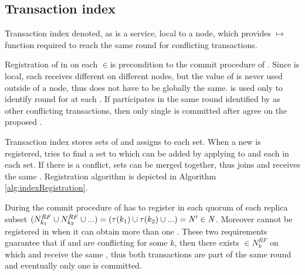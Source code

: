 
\subsection{Transaction index}
\label{sec:mpp:txIndex}
Transaction index denoted, as \txIndex is a service, local to a node, which provides \mbox{\txState $\mapsto $ \paxosRoundId} function required to reach the same \paxos round for conflicting transactions.

Registration of \txState in \txIndex on each  $\in$\nodesTx is precondition to the commit procedure of \mpt. 
Since \txIndex is local, each \transaction receives different \paxosRoundId on different nodes, but the value of \paxosRoundId is never used outside of a node, thus \paxosRoundId does not have to be globally the same. \paxosRoundId is used only to identify \paxos round for \conflictingTxSet at each . If \transaction participates in the same \paxos round identified by \paxosRoundId as other conflicting transactions, then only single \transaction is committed after \nodesTx agree on the proposed \txState.

Transaction index stores sets of \conflictingTxSet and assigns \paxosRoundId to each set. When a new \txStateM is registered, \txIndex tries to find a set \conflictingTxSet to which \txStateM can be added by applying \conflictFunction to \txStateM and each \transaction in each set. If there is a conflict, sets can be merged together, thus \txStateM joins \conflictingTxSet and receives the same \paxosRoundId. Registration algorithm is depicted in Algorithm \ref{alg:indexRegistration}.

During the commit procedure of \mpt \transactionFull has to register in each quorum of each replica subset
$(N^{RF}_{k_1} \cup N^{RF}_{k_2} \cup ... ) =
(\tau(k_1) \cup \tau(k_2) \cup ... ) = 
 \text{$\mathit{N'}$}\in\mathit{N}$.
Moreover \transaction cannot be registered in \txIndex when it can obtain more than one \paxosRoundId. These two requirements guarantee that if \txOne and \txTwo are conflicting for some $k$, then there exists 
$\in N^{RF}_{k}$ on which \txOne and \txTwo receive the same \paxosRoundId, thus both transactions are part of the same \paxos round and eventually only one is committed.

